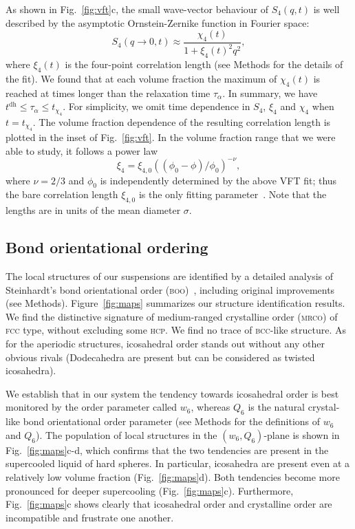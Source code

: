As shown in Fig.~\ref{fig:vft}c, the small wave-vector behaviour of $S_4(q,t)$ is well described by the asymptotic Ornstein-Zernike function in Fourier space:
\begin{equation}
	S_4(q\rightarrow 0,t) \approx \frac{\chi_4(t)}{1+\xi_4(t)^2 q^2},
	\label{eq:OZ_Fourier}
\end{equation}
where $\xi_4(t)$ is the four-point correlation length (see Methods for the details of the fit). We found that at each volume fraction the maximum of $\chi_4(t)$ is reached at times longer than the relaxation time $\tau_\alpha$. In summary, we have
$t^\text{dh} \leq \tau_\alpha \leq t_{\chi_4}$.
For simplicity, we omit time dependence in $S_4$, $\xi_4$ and $\chi_4$ when $t=t_{\chi_4}$. The volume fraction dependence of the resulting correlation length is plotted in the inset of Fig.~\ref{fig:vft}. In the volume fraction range that we were able to study, it follows a power law
\begin{equation}
\xi_{4} =\xi_{4,0} ((\phi_0-\phi)/\phi_0)^{-\nu},
\label{eq:xi4ofphi}
\end{equation}
where $\nu=2/3$ and $\phi_0$ is independently determined by the above VFT fit; thus the bare correlation length $\xi_{4,0}$ is the only fitting parameter~\citep{tanaka2010critical}. Note that the lengths are in units of the mean diameter $\sigma$.


\subsection*{Bond orientational ordering}

The local structures of our suspensions are identified by a detailed analysis of Steinhardt's bond orientational order (\textsc{boo})~\citep{steinhardt1983boo}, including original improvements (see Methods). Figure~\ref{fig:maps} summarizes our structure identification results. We find the distinctive signature of medium-ranged crystalline order (\textsc{mrco}) of \textsc{fcc} type, without excluding some \textsc{hcp}. We find no trace of \textsc{bcc}-like structure. As for the aperiodic structures, icosahedral order stands out without any other obvious rivals (Dodecahedra are present but can be considered as twisted icosahedra).


We establish that in our system the tendency towards icosahedral order is best monitored by the order parameter called $w_6$, whereas $Q_6$ is the natural crystal-like bond 
orientational order parameter (see Methods for the definitions of $w_6$ and $Q_6$). The population of local structures in the $(w_6,Q_6)$-plane is shown in Fig.~\ref{fig:maps}c-d, which confirms that the two tendencies are present in the supercooled liquid of hard spheres. In particular, icosahedra are present even at a relatively low volume fraction (Fig.~\ref{fig:maps}d). Both tendencies become more pronounced for deeper supercooling (Fig.~\ref{fig:maps}c). Furthermore, Fig.~\ref{fig:maps}c shows clearly that icosahedral order and crystalline order are incompatible and frustrate one another.


